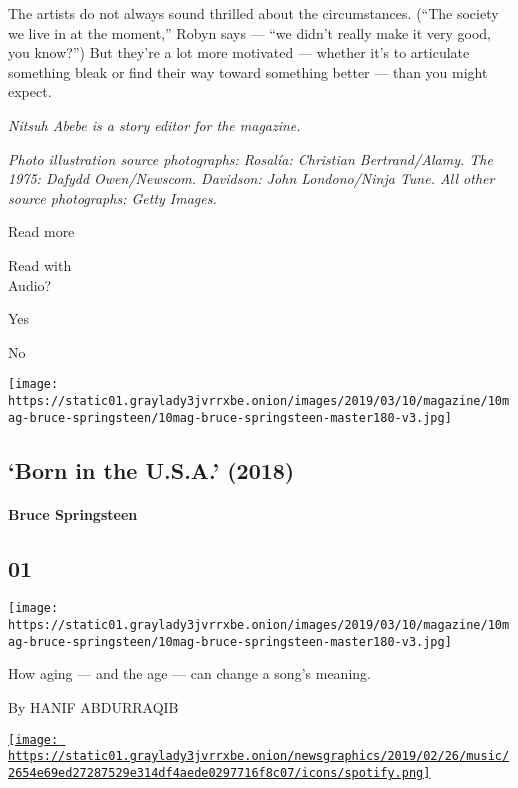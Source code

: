 The artists do not always sound thrilled about the circumstances. (``The
society we live in at the moment,'' Robyn says --- ``we didn't really
make it very good, you know?'') But they're a lot more motivated ---
whether it's to articulate something bleak or find their way toward
something better --- than you might expect.

\emph{Nitsuh Abebe is a story editor for the magazine.}

\emph{Photo illustration source photographs: Rosalía: Christian
Bertrand/Alamy. The 1975: Dafydd Owen/Newscom. Davidson: John
Londono/Ninja Tune. All other source photographs: Getty Images.}

Read more

Read with\\
Audio?

Yes

No

\texttt{[image: https://static01.graylady3jvrrxbe.onion/images/2019/03/10/magazine/10mag-bruce-springsteen/10mag-bruce-springsteen-master180-v3.jpg]}

\hypertarget{--born-in-the-usa-2018}{%
\subsection{\texorpdfstring{ `Born in the U.S.A.'
(2018)}{  `Born in the U.S.A.' (2018)}}\label{--born-in-the-usa-2018}}

\hypertarget{bruce-springsteen}{%
\paragraph{Bruce Springsteen}\label{bruce-springsteen}}

\hypertarget{01}{%
\subsection{01}\label{01}}

\texttt{[image: https://static01.graylady3jvrrxbe.onion/images/2019/03/10/magazine/10mag-bruce-springsteen/10mag-bruce-springsteen-master180-v3.jpg]}

How aging --- and the age --- can change a song's meaning.

By HANIF ABDURRAQIB

\href{https://open.spotify.com/track/6TGhSdj9CaXcxTHLjbNNYL}{\texttt{[image: https://static01.graylady3jvrrxbe.onion/newsgraphics/2019/02/26/music/2654e69ed27287529e314df4aede0297716f8c07/icons/spotify.png]}}

